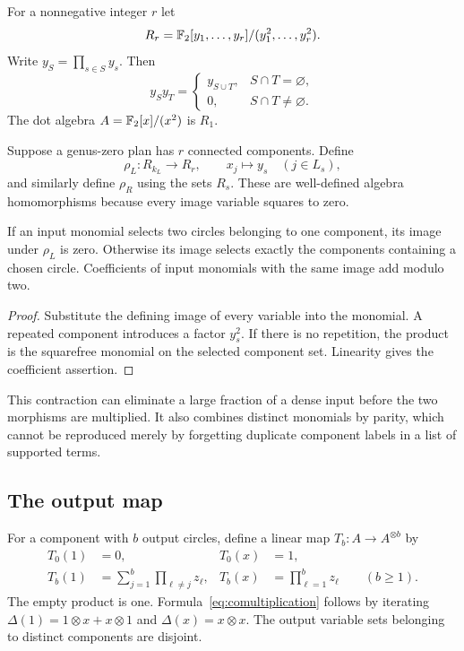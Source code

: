 For a nonnegative integer $r$ let
\[
 R_r=\mathbb F_2[y_1,\ldots,y_r]/(y_1^2,\ldots,y_r^2).
\]
Write $y_S=\prod_{s\in S}y_s$. Then
\begin{equation}
 y_Sy_T=
 \begin{cases}
 y_{S\cup T},&S\cap T=\varnothing,\\
 0,&S\cap T\ne\varnothing.
 \end{cases}
 \label{eq:squarefree}
\end{equation}
The dot algebra $A=\mathbb F_2[x]/(x^2)$ is $R_1$.

Suppose a genus-zero plan has $r$ connected components. Define
\[
 \rho_L:R_{k_L}\longrightarrow R_r,
 \qquad x_j\longmapsto y_s\quad(j\in L_s),
\]
and similarly define $\rho_R$ using the sets $R_s$. These are well-defined
algebra homomorphisms because every image variable squares to zero.

\begin{lemma}
\label{lem:contraction}
If an input monomial selects two circles belonging to one component,
its image under $\rho_L$ is zero. Otherwise its image selects exactly the
components containing a chosen circle. Coefficients of input monomials
with the same image add modulo two.
\end{lemma}
\begin{proof}
Substitute the defining image of every variable into the monomial. A
repeated component introduces a factor $y_s^2$. If there is no repetition,
the product is the squarefree monomial on the selected component set.
Linearity gives the coefficient assertion.
\end{proof}

This contraction can eliminate a large fraction of a dense input before
the two morphisms are multiplied. It also combines distinct monomials by
parity, which cannot be reproduced merely by forgetting duplicate
component labels in a list of supported terms.

\subsection{The output map}

For a component with $b$ output circles, define a linear map
$T_b:A\to A^{\otimes b}$ by
\begin{align}
 T_0(1)&=0, &T_0(x)&=1,\label{eq:trace}\\
 T_b(1)&=\sum_{j=1}^{b}\prod_{\ell\ne j}z_\ell,
 &T_b(x)&=\prod_{\ell=1}^{b}z_\ell\qquad(b\geq1).
 \label{eq:comultiplication}
\end{align}
The empty product is one. Formula~\eqref{eq:comultiplication} follows by
iterating $\Delta(1)=1\otimes x+x\otimes1$ and
$\Delta(x)=x\otimes x$. The output variable sets belonging to distinct
components are disjoint.

